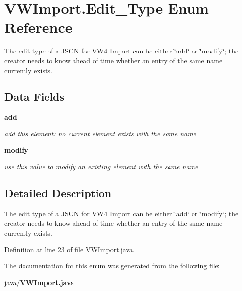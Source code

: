\section{V\-W\-Import.\-Edit\-\_\-\-Type Enum Reference}
\label{enumorg_1_1smallfoot_1_1vw4_1_1VWImport_1_1Edit__Type}


The edit type of a J\-S\-O\-N for V\-W4 Import can be either \char`\"{}add\char`\"{} or \char`\"{}modify\char`\"{}; the creator needs to know ahead of time whether an entry of the same name currently exists.  


\subsection*{Data Fields}
\begin{DoxyCompactItemize}
\item 
{\bf add}\label{enumorg_1_1smallfoot_1_1vw4_1_1VWImport_1_1Edit__Type_a393e4cd5187ecf30d2db2129a73f3c05}

\begin{DoxyCompactList}\small\item\em add this element\-: no current element exists with the same name \end{DoxyCompactList}\item 
{\bf modify}\label{enumorg_1_1smallfoot_1_1vw4_1_1VWImport_1_1Edit__Type_afa21b51665d4dc82669bba18a62d8b58}

\begin{DoxyCompactList}\small\item\em use this value to modify an existing element with the same name \end{DoxyCompactList}\end{DoxyCompactItemize}


\subsection{Detailed Description}
The edit type of a J\-S\-O\-N for V\-W4 Import can be either \char`\"{}add\char`\"{} or \char`\"{}modify\char`\"{}; the creator needs to know ahead of time whether an entry of the same name currently exists. 

Definition at line 23 of file V\-W\-Import.\-java.



The documentation for this enum was generated from the following file\-:\begin{DoxyCompactItemize}
\item 
java/{\bf V\-W\-Import.\-java}\end{DoxyCompactItemize}

